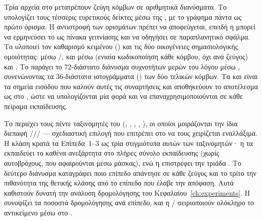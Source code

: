 Τρία αρχεία στο \texttt{} μετατρέπουν ζεύγη κόμβων σε αριθμητικά
διανύσματα.
Το \texttt{} υπολογίζει τους τέσσερις ευρετικούς δείκτες μέσω
της \texttt{}, με το γράφημα πάντα ως πρώτο όρισμα.
Η αντιστροφή των ορισμάτων πρέπει να αποφεύγεται, επειδή η  μπορεί να
ερμηνεύσει το  ως πίνακα γειτνίασης και να οδηγήσει σε παραπλανητικό σφάλμα.
Το \texttt{} υλοποιεί
τον καθαρισμό κειμένου  (\texttt{}) και τις δύο οικογένειες
σημασιολογικής ομοιότητας:  μέσω \texttt{}/\texttt{}, και
 μέσω \texttt{} (ενιαία κωδικοποίηση κάθε κόμβου, όχι
ανά ζεύγος) και \texttt{}.
Το \texttt{} παράγει το
72-διάστατο διάνυσμα συχνοτήτων μερών του λόγου μέσω \texttt{},
συνενώνοντας τα 36-διάστατα ιστογράμματα (\texttt{}) των δύο τελικών
κόμβων.
Τα \texttt{} και \texttt{} είναι τα σημεία
εισόδου  που καλούν αυτές τις συναρτήσεις και αποθηκεύουν το αποτέλεσμα ως
 στο \texttt{}, ώστε να υπολογίζονται μία φορά και να επαναχρησιμοποιούνται
σε κάθε πείραμα εκπαίδευσης.

Το \texttt{} περιέχει τους πέντε ταξινομητές του 
(\texttt{}, \texttt{}, \texttt{},
\texttt{}, \texttt{}), οι οποίοι μοιράζονται την ίδια διεπαφή
\texttt{}/\texttt{}/\texttt{}/\texttt{} — σχεδιαστική επιλογή που επιτρέπει
στο \texttt{} να τους χειρίζεται εναλλάξιμα.
Η κλάση \texttt{}
κρατά τα Επίπεδα~1--3 ως τρία στιγμιότυπα αυτών των ταξινομητών· η
\texttt{} τα εκπαιδεύει το καθένα ανεξάρτητα στο πλήρες σύνολο εκπαίδευσης (χωρίς
αυτοβρόχους, που αφαιρούνται μέσω μάσκας), ενώ η \texttt{} επιστρέφει την τριάδα
\texttt{}.
Το δεύτερο διάνυσμα καταγράφει ποιο επίπεδο απάντησε σε
κάθε ζεύγος και το τρίτο την πιθανότητα της θετικής κλάσης από το επίπεδο που
έλαβε την απόφαση.
Αυτά καθιστούν δυνατή την ανάλυση δρομολόγησης του
Κεφαλαίου~\ref{ch:experiments}.
Η \texttt{} συνοψίζει τα ποσοστά δρομολόγησης ανά
επίπεδο, και η \texttt{}/\texttt{} σειριοποιούν ολόκληρο το αντικείμενο μέσω
\texttt{} στο \texttt{}.

